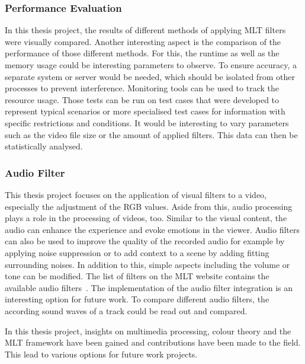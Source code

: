 \documentclass[../MasterThesis.tex]{subfiles}
\begin{document}
\subsubsection*{Performance Evaluation}


In this thesis project, the results of different methods of applying MLT filters were visually compared. Another interesting aspect is the comparison of the performance of those different methods. For this, the runtime as well as the memory usage could be interesting parameters to observe. 
To ensure accuracy, a separate system or server would be needed, which should be isolated from other processes to prevent interference. Monitoring tools can be used to track the resource usage. 
Those tests can be run on test cases that were developed to represent typical scenarios or more specialised test cases for information with specific restrictions and conditions.
It would be interesting to vary parameters such as the video file size or the amount of applied filters.
This data can then be statistically analysed.












\subsubsection*{Audio Filter}

This thesis project focuses on the application of visual filters to a video, especially the adjustment of the RGB values. Aside from this, audio processing plays a role in the processing of videos, too. Similar to the visual content, the audio can enhance the experience and evoke emotions in the viewer. Audio filters can also be used to improve the quality of the recorded audio for example by applying noise suppression or to add context to a scene by adding fitting surrounding noises. In addition to this, simple aspects including the volume or tone can be modified.
The list of filters on the MLT website contains the available audio filters~\cite{melt}.
The implementation of the audio filter integration is an interesting option for future work. To compare different audio filters, the according sound waves of a track could be read out and compared.




In this thesis project, insights on multimedia processing, colour theory and the MLT framework have been gained and contributions have been made to the field. This lead to various options for future work projects.







	
	
\end{document}
